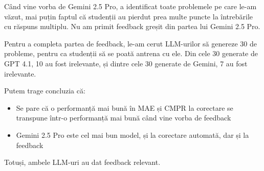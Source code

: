 \documentclass[12pt, a4paper]{report}
\begin{document}
Când vine vorba de Gemini 2.5 Pro, a identificat toate problemele pe care le-am văzut, mai puțin faptul că studenții au pierdut prea multe puncte la întrebările cu răspuns multiplu.
Nu am primit feedback greșit din partea lui Gemini 2.5 Pro.

Pentru a completa partea de feedback,
le-am cerut LLM-urilor să genereze 30 de probleme,
pentru ca studenții să se poată antrena cu ele.
Din cele 30 generate de GPT 4.1, 10 au fost irelevante, și dintre cele 30 generate de Gemini, 7 au fost irelevante.

Putem trage concluzia că:
\begin{itemize}
\item Se pare că o performanță mai bună în MAE și CMPR la corectare
se transpune într-o performanță mai bună când vine vorba de feedback
\item Gemini 2.5 Pro este cel mai bun model, și la corectare automată, dar și la feedback
\end{itemize}

Totuși, ambele LLM-uri au dat feedback relevant.


\printbibliography[heading=bibintoc]
\end{document}
